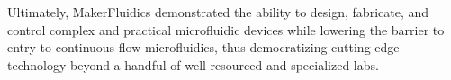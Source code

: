Ultimately, MakerFluidics demonstrated the ability to design, fabricate, and control complex and practical microfluidic devices while lowering the barrier to entry to continuous-flow microfluidics, thus democratizing cutting edge technology beyond a handful of well-resourced and specialized labs. 


